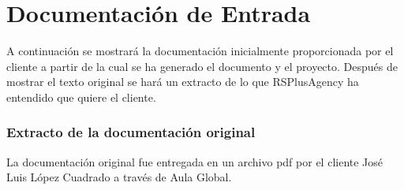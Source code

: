 \chapter{Documentación de Entrada}\label{sec:initialdocs}
\par A continuación se mostrará la documentación inicialmente proporcionada por el cliente a partir de la cual se ha generado el documento y el proyecto. Después de mostrar el texto original se hará un extracto de lo que RSPlusAgency ha entendido que quiere el cliente.
\subsection{Extracto de la documentación original}
\par La documentación original fue entregada en un archivo pdf por el cliente José Luis López Cuadrado a través de Aula Global.

